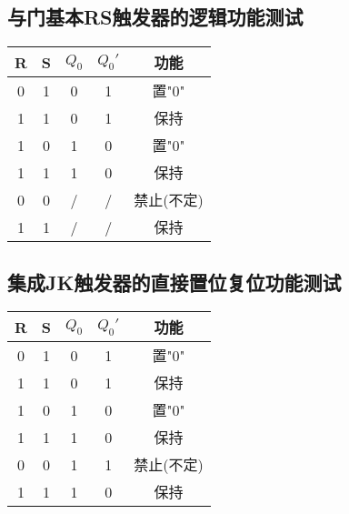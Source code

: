 \documentclass{article}
\begin{document}
\subsection{与门基本RS触发器的逻辑功能测试}
\begin{table}[h]
    \centering  
    \begin{tabular}{c|c|c|c|c}
        \hline
              R             & S    &$Q_0$    &$Q_0'$             &功能  \\ \hline
              0             & 1    &0        &   1             & 置"0" \\ \hline
              1             & 1    &0        &   1               & 保持            \\ \hline
              1             & 0    &1        &   0              & 置"0"            \\ \hline
              1             & 1    &1        &   0               & 保持            \\ \hline
              0             & 0    &/        &   /               & 禁止(不定)            \\ \hline
              1             & 1    &/        &   /              & 保持            \\ \hline
        
            \end{tabular}
  \end{table}


\subsection{集成JK触发器的直接置位复位功能测试}
\begin{table}[h]
    \centering  
    \begin{tabular}{c|c|c|c|c}
        \hline
              R             & S    &$Q_0$    &$Q_0'$             &功能  \\ \hline
              0             & 1    &0   & 1                      & 置"0" \\ \hline
              1             & 1    &0        &   1              & 保持            \\ \hline
              1             & 0    &1        &   0               & 置"0"            \\ \hline
              1             & 1    &1        &   0               & 保持            \\ \hline
              0             & 0    &1        &   1               & 禁止(不定)            \\ \hline
              1             & 1    &1        &   0               & 保持            \\ \hline
        
            \end{tabular}
  \end{table}
\end{document}

